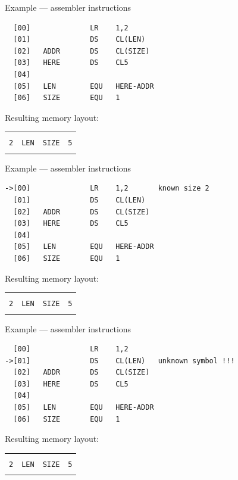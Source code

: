 \documentclass[10pt]{beamer}
\begin{document}
\newcommand{\coltt}[2]{\multicolumn{1}{#1}{\centering\texttt{#2}}}
\newcommand{\rotl}[1]{\multicolumn{1}{l}{\hspace{-10pt}\rotatebox{90}{\texttt{#1} }}}
\newcommand{\rotc}{\multicolumn{1}{c}{\rotatebox{90}{\texttt{<-} }}}

\newcommand{\mem}[4]
{
	
	Resulting memory layout:
	
	\begin{table}[]
		\begin{tabular}{llll}
			#1                    & #2                   & #3                    & #4                   \\
			\coltt{|p{0.5cm}|}{2} & \coltt{p{2cm}|}{LEN} & \coltt{p{3cm}|}{SIZE} & \coltt{p{1.5cm}|}{5} \\ \hline
			                      &                      & \rotl{ADDR->}         & \rotl{HERE->}
		\end{tabular}
	\end{table}
}

\begin{frame}[fragile]{Example --- assembler instructions}
	
	\begin{verbatim}
  [00]              LR    1,2
  [01]              DS    CL(LEN)
  [02]   ADDR       DS    CL(SIZE)
  [03]   HERE       DS    CL5
  [04]
  [05]   LEN        EQU   HERE-ADDR
  [06]   SIZE       EQU   1
	\end{verbatim}
	
	\mem{}{}{}{}
	
\end{frame}


\begin{frame}[fragile]{Example --- assembler instructions}
  
\begin{verbatim}
->[00]              LR    1,2       known size 2
  [01]              DS    CL(LEN) 
  [02]   ADDR       DS    CL(SIZE)
  [03]   HERE       DS    CL5
  [04]
  [05]   LEN        EQU   HERE-ADDR
  [06]   SIZE       EQU   1
\end{verbatim}
	
	\mem{\rotc}{}{}{}
	
\end{frame}

\begin{frame}[fragile]{Example --- assembler instructions}
	
	\begin{verbatim}
  [00]              LR    1,2
->[01]              DS    CL(LEN)   unknown symbol !!!
  [02]   ADDR       DS    CL(SIZE)
  [03]   HERE       DS    CL5
  [04]
  [05]   LEN        EQU   HERE-ADDR
  [06]   SIZE       EQU   1
	\end{verbatim}
	
	\mem{}{\rotc}{}{}
	
\end{frame}
\end{document}
